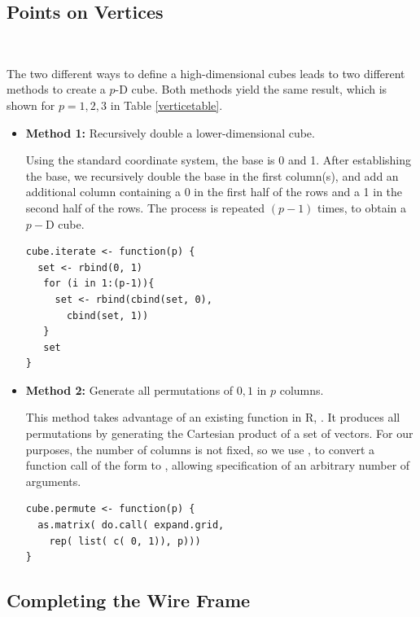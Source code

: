 \documentclass[a4paper]{report}
\begin{document}
\begin{article}
\subsection{Points on Vertices}~\label{cube-vertices}

The two different ways to define a high-dimensional cubes leads to two
different methods to create a $p$-D cube. Both methods yield the same
result, which is shown for $p=1,2,3$ in Table \ref{verticetable}.

\begin{itemize}

  \item {\bf Method 1:} Recursively double a lower-dimensional cube.
 
    Using the standard coordinate system, the base is 0 and 1. After
    establishing the base, we recursively double the base in the first
    column(s), and add an additional column containing a 0 in the
    first half of the rows and a 1 in the second half of the rows. The
    process is repeated $(p-1)$ times, to obtain a $p-$D cube.

\begin{verbatim}
cube.iterate <- function(p) {
  set <- rbind(0, 1)
   for (i in 1:(p-1)){
     set <- rbind(cbind(set, 0), 
       cbind(set, 1))
   }
   set
} 
\end{verbatim}

  \item {\bf Method 2:} Generate all permutations of ${0, 1}$ in $p$ columns.
  
    This method takes advantage of an existing function in R,
    . It produces all permutations by generating the
    Cartesian product of a set of vectors. For our purposes, the
    number of columns is not fixed, so we use , to
    convert a function call of the form  to
    , allowing specification of an
    arbitrary number of arguments.

  \begin{verbatim}
cube.permute <- function(p) {
  as.matrix( do.call( expand.grid, 
    rep( list( c( 0, 1)), p)))
}
\end{verbatim}
\end{itemize}

\subsection{Completing the Wire Frame}


\end{article}
\end{document}
